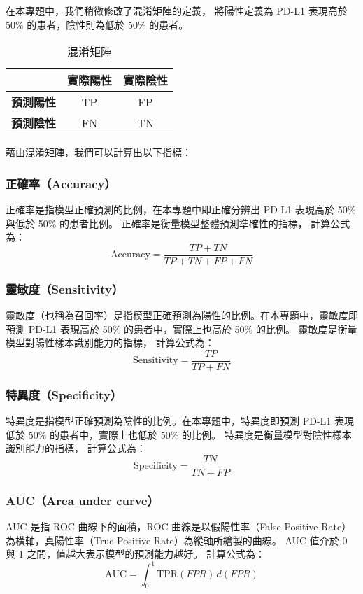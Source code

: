 \documentclass[12pt,a4paper]{article}
\begin{document}
在本專題中，我們稍微修改了混淆矩陣的定義，
將陽性定義為 PD-L1 表現高於 50\% 的患者，陰性則為低於 50\% 的患者。

\begin{table}[h]
\centering
\begin{tabular}{|c|c|c|}
\hline
 & \textbf{實際陽性} & \textbf{實際陰性} \\ \hline
\textbf{預測陽性} & TP & FP \\ \hline
\textbf{預測陰性} & FN & TN \\ \hline
\end{tabular}
\caption{混淆矩陣}
\end{table}

藉由混淆矩陣，我們可以計算出以下指標：

\subsubsection{正確率（Accuracy）}
正確率是指模型正確預測的比例，在本專題中即正確分辨出 PD-L1 表現高於 50\% 與低於 50\% 的患者比例。
正確率是衡量模型整體預測準確性的指標，
計算公式為：
\begin{equation}
\text{Accuracy} = \frac{TP + TN}{TP + TN + FP + FN}
\end{equation}

\subsubsection{靈敏度（Sensitivity）}
靈敏度（也稱為召回率）是指模型正確預測為陽性的比例。在本專題中，靈敏度即預測 PD-L1 表現高於 50\% 的患者中，實際上也高於 50\% 的比例。
靈敏度是衡量模型對陽性樣本識別能力的指標，
計算公式為：
\begin{equation}
\text{Sensitivity} = \frac{TP}{TP + FN}
\end{equation}

\subsubsection{特異度（Specificity）}
特異度是指模型正確預測為陰性的比例。在本專題中，特異度即預測 PD-L1 表現低於 50\% 的患者中，實際上也低於 50\% 的比例。
特異度是衡量模型對陰性樣本識別能力的指標，
計算公式為：
\begin{equation}
\text{Specificity} = \frac{TN}{TN + FP}
\end{equation}
\subsubsection{AUC（Area under curve）}
AUC 是指 ROC 曲線下的面積，ROC 曲線是以假陽性率（False Positive Rate）為橫軸，真陽性率（True Positive Rate）為縱軸所繪製的曲線。
AUC 值介於 0 與 1 之間，值越大表示模型的預測能力越好。
計算公式為：
\begin{equation}
\text{AUC} = \int_{0}^{1} \text{TPR}(FPR) \, d(FPR)
\end{equation}
\end{document}
